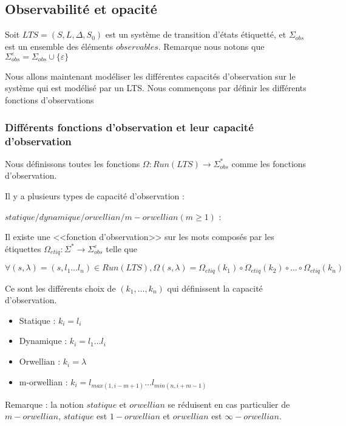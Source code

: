 \documentclass[10pt,a4paper]{article}
\begin{document}
\subsection{Observabilit\'e et opacit\'e}

Soit $LTS=(S,L,\Delta,S_0)$ est un syst\`eme de transition d'\'etats \'etiquett\'e, et $\Sigma_{obs}$ est un ensemble des \'el\'ements $observables$. Remarque nous notons que $\Sigma_{obs}^{\varepsilon} = \Sigma_{obs} \cup \{\varepsilon\}$

Nous allons maintenant mod\'eliser les diff\'erentes capacit\'es d'observation sur le syst\`eme qui est mod\'elis\'e par un LTS. Nous commen\c cons par d\'efinir les diff\'erents fonctions d'observations

\subsubsection{Diff\'erents fonctions d'observation et leur capacit\'e d'observation}

Nous d\'efinissons toutes les fonctions $\Omega : Run(LTS) \rightarrow \Sigma_{obs}^*$ comme les fonctions   
 d'observation.
 
Il y a plusieurs types de capacit\'e d'observation : 


$statique/dynamique/orwellian/m-orwellian(m\geq 1)$ :
		
Il existe une <<fonction d'observation>> sur les mots compos\'es par les \'etiquettes $\Omega_{etiq} : \Sigma^* \rightarrow \Sigma_{obs}^{\varepsilon}$ telle que 
	
	$$\forall (s,\lambda)= (s,l_1\dots l_n) \in Run(LTS), \Omega(s,\lambda) = \Omega_{etiq}(k_1)\circ\Omega_{etiq}(k_2)\circ\dots\circ\Omega_{etiq}(k_n)$$
	
	Ce sont les diff\'erents choix de $(k_1,\dots, k_n)$ qui d\'efinissent la capacit\'e d'observation.
	



\begin{itemize}
        \item Statique : $k_i = l_i$ 
	\item Dynamique : $k_i = l_1 \dots l_i$
	\item Orwellian : $k_i = \lambda$
	\item m-orwellian : $k_i = l_{max(1,i-m+1)} \dots l_{min(n,i+m-1)}$		

\end{itemize}

	Remarque : la notion $statique$ et $orwellian$ se r\'eduisent en cas particulier de $m-orwellian$, $statique$ est $1-orwellian$ et $orwellian$ est $\infty-orwellian$.
\end{document}

